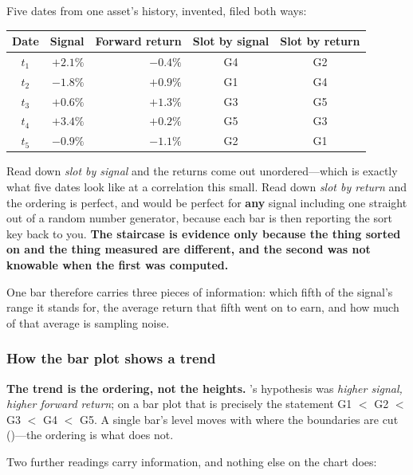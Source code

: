 \begin{example}\label{ex:sort-key}
Five dates from one asset's history, invented, filed both ways:

\begin{center}
\begin{tabular}{|c|r|r|c|c|}
\hline
\textbf{Date} & \textbf{Signal} & \textbf{Forward return} & \textbf{Slot by signal} & \textbf{Slot by return} \\ \hline
$t_1$ & $+2.1\%$ & $-0.4\%$ & G4 & G2 \\ \hline
$t_2$ & $-1.8\%$ & $+0.9\%$ & G1 & G4 \\ \hline
$t_3$ & $+0.6\%$ & $+1.3\%$ & G3 & G5 \\ \hline
$t_4$ & $+3.4\%$ & $+0.2\%$ & G5 & G3 \\ \hline
$t_5$ & $-0.9\%$ & $-1.1\%$ & G2 & G1 \\ \hline
\end{tabular}
\end{center}

Read down \emph{slot by signal} and the returns come out unordered---which is exactly what five
dates look like at a correlation this small. Read down \emph{slot by return} and the ordering is
perfect, and would be perfect for \textbf{any} signal including one straight out of a random number
generator, because each bar is then reporting the sort key back to you. \textbf{The staircase is
evidence only because the thing sorted on and the thing measured are different, and the second was
not knowable when the first was computed.}
\end{example}

One bar therefore carries three pieces of information: which fifth of the signal's range it stands
for, the average return that fifth went on to earn, and how much of that average is sampling noise.

\subsubsection{How the bar plot shows a trend}\label{sec:bar-plot-trend}

\textbf{The trend is the ordering, not the heights.} 's hypothesis was
\emph{higher signal, higher forward return}; on a bar plot that is precisely the statement
G1 $<$ G2 $<$ G3 $<$ G4 $<$ G5. A single bar's level moves with where the boundaries are cut
()---the ordering is what does not.

Two further readings carry information, and nothing else on the chart does:

